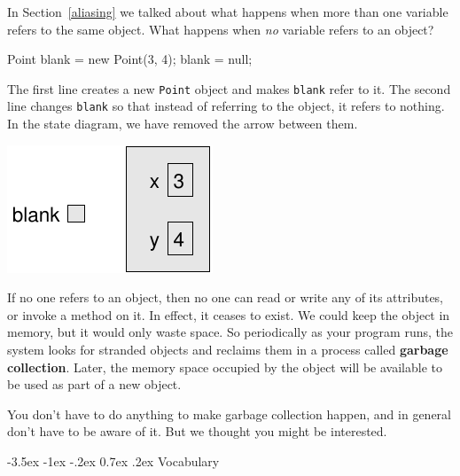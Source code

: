 \documentclass[12pt]{book}
\makeatletter
\theoremstyle{exercise}
\newcommand{\java}[1]{\verb"#1"}
\renewcommand{\section}{\@startsection{section}{1}{\z@}%
    {-3.5ex \@plus -1ex \@minus -.2ex}%
    {0.7ex \@plus.2ex}%
    {\normalfont\Large\bfseries}}
\newcommand{\java}[1]{\lstinline{#1}} %
\makeatother
\begin{document}
In Section~\ref{aliasing} we talked about what happens when more than one variable refers to the same object.
What happens when {\em no} variable refers to an object?

\begin{code}
    Point blank = new Point(3, 4);
    blank = null;
\end{code}

The first line creates a new \java{Point} object and makes \java{blank} refer to it.
The second line changes \java{blank} so that instead of referring to the object, it refers to nothing.
In the state diagram, we have removed the arrow between them.

\begin{center}
\includegraphics{figs/reference3.pdf}
\end{center}


If no one refers to an object, then no one can read or write any of its attributes, or invoke a method on it.
In effect, it ceases to exist.
We could keep the object in memory, but it would only waste space.
So periodically as your program runs, the system looks for stranded objects and reclaims them in a process called {\bf garbage collection}.
Later, the memory space occupied by the object will be available to be used as part of a new object.

You don't have to do anything to make garbage collection happen, and in general don't have to be aware of it.
But we thought you might be interested.



\section{Vocabulary}
\end{document}
